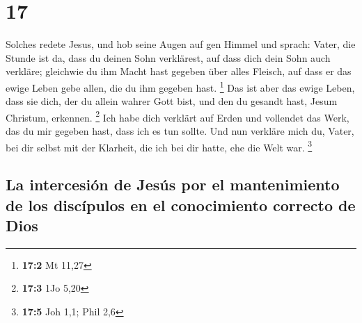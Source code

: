 \hypertarget{section-16}{%
\section{17}\label{section-16}}

 Solches redete Jesus, und hob seine Augen auf gen Himmel
und sprach: Vater, die Stunde ist da, dass du deinen Sohn verklärest,
auf dass dich dein Sohn auch verkläre;  gleichwie du ihm
Macht hast gegeben über alles Fleisch, auf dass er das ewige Leben gebe
allen, die du ihm gegeben hast. \footnote{\textbf{17:2} Mt 11,27}
 Das ist aber das ewige Leben, dass sie dich, der du
allein wahrer Gott bist, und den du gesandt hast, Jesum Christum,
erkennen. \footnote{\textbf{17:3} 1Jo 5,20}  Ich habe dich
verklärt auf Erden und vollendet das Werk, das du mir gegeben hast, dass
ich es tun sollte.  Und nun verkläre mich du, Vater, bei
dir selbst mit der Klarheit, die ich bei dir hatte, ehe die Welt war.
\footnote{\textbf{17:5} Joh 1,1; Phil 2,6}

\hypertarget{la-intercesiuxf3n-de-jesuxfas-por-el-mantenimiento-de-los-discuxedpulos-en-el-conocimiento-correcto-de-dios}{%
\subsection{La intercesión de Jesús por el mantenimiento de los
discípulos en el conocimiento correcto de
Dios}\label{la-intercesiuxf3n-de-jesuxfas-por-el-mantenimiento-de-los-discuxedpulos-en-el-conocimiento-correcto-de-dios}}

